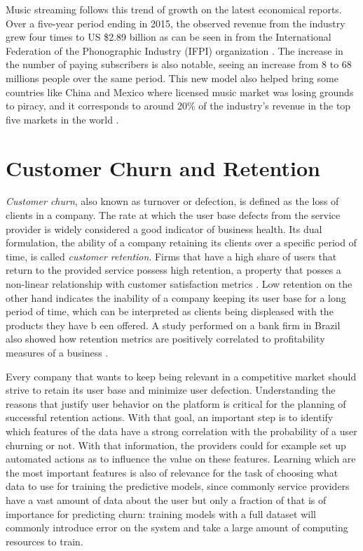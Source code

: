 \documentclass{kththesis}
\begin{document}
	Music streaming follows this trend of growth on the latest economical reports. Over a five-year period ending in 2015, the observed revenue from the industry grew four times to US \$2.89 billion as can be seen in  from the International Federation of the Phonographic Industry (IFPI) organization \citep{ifpi}. The increase in the number of paying subscribers is also notable, seeing an increase from 8 to 68 millions people over the same period. This new model also helped bring some countries like China and Mexico where licensed music market was losing grounds to piracy, and it corresponds to around 20\% of the industry's revenue in the top five markets in the world \citep{ifpi}. 
	  
\section{Customer Churn and Retention} 

\emph{Customer churn}, also known as turnover or defection, is defined as the loss of clients in a company. The rate at which the user base defects from the service provider is widely considered a good indicator of business health. Its dual formulation, the ability of a company retaining its clients over a specific period of time, is called \emph{customer retention}. Firms that have a high share of users that return to the provided service possess high retention, a property that posses a non-linear relationship with customer satisfaction metrics \citep{hennig1997impact}. Low retention on the other hand indicates the inability of a company keeping its user base for a long period of time, which can be interpreted as clients being displeased with the products they have b	een offered. A study performed on a bank firm in Brazil also showed how retention metrics are positively correlated to profitability measures of a business \citep{morgan2006value}. 
        
Every company that wants to keep being relevant in a competitive market should strive to retain its user base and minimize user defection. Understanding the reasons that justify user behavior on the platform is critical for the planning of successful retention actions. With that goal, an important step is to identify which features of the data have a strong correlation with the probability of a user churning or not. With that information, the providers could for example set up automated actions as to influence the value on these features. Learning which are the most important features is also of relevance for the task of choosing what data to use for training the predictive models, since commonly service providers have a vast amount of data about the user but only a fraction of that is of importance for predicting churn: training models with a full dataset will commonly introduce error on the system and take a large amount of computing resources to train.
\end{document}
